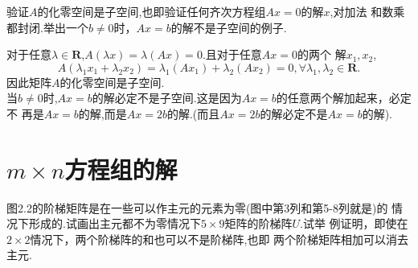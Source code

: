 ﻿\documentclass{book} \usepackage{exsheets} \usepackage{xeCJK}
\begin{document}
\begin{question}
  验证$A$的化零空间是子空间,也即验证任何齐次方程组$Ax=0$的解$x$,对加法
  和数乘都封闭.举出一个$b\neq 0$时，$Ax=b$的解不是子空间的例子.
\end{question}
\begin{solution}
  对于任意$\lambda \in
  \mathbf{R}$,$A(\lambda x)=\lambda (Ax)=0$.且对于任意$Ax=0$的两个
  解$x_1,x_2$,
$$
A(\lambda_1x_1+\lambda_2
x_2)=\lambda_1(Ax_1)+\lambda_2(Ax_2)=0,\forall \lambda_1,\lambda_2\in
\mathbf{R}.
$$
因此矩阵$A$的化零空间是子空间.\\

当$b\neq
0$时,$Ax=b$的解必定不是子空间.这是因为$Ax=b$的任意两个解加起来，必定不
再是$Ax=b$的解,而是$Ax=2b$的解.(而且$Ax=2b$的解必定不是$Ax=b$的解).
\end{solution}
\section{$m\times n$方程组的解}
\begin{question}
  图2.2的阶梯矩阵是在一些可以作主元的元素为零(图中第3列和第5-8列就是)的
  情况下形成的.试画出主元都不为零情况下$5\times 9$矩阵的阶梯阵$U$.试举
  例证明，即使在$2\times 2$情况下，两个阶梯阵的和也可以不是阶梯阵,也即
  两个阶梯矩阵相加可以消去主元.
\end{question}
\end{document}
